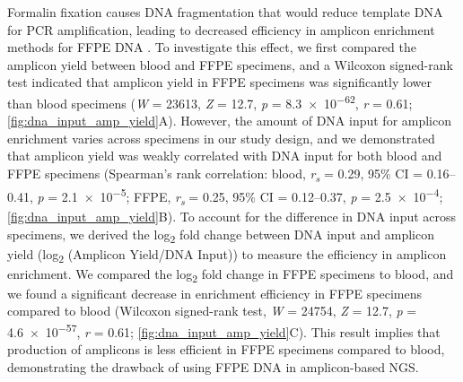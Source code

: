 Formalin fixation causes DNA fragmentation that would reduce template DNA for PCR amplification, leading to decreased efficiency in amplicon enrichment methods for FFPE DNA \cite{Didelot2013, Do2015a, Wong2013, Wong2014}. To investigate this effect, we first compared the amplicon yield between blood and FFPE specimens, and a Wilcoxon signed-rank test indicated that amplicon yield in FFPE specimens was significantly lower than blood specimens (\textit{W} = 23613, \textit{Z} = 12.7, \textit{p} = \num{8.3e-62}, \textit{r} = 0.61; \autoref{fig:dna_input_amp_yield}A). However, the amount of DNA input for amplicon enrichment varies across specimens in our study design, and we demonstrated that amplicon yield was weakly correlated with DNA input for both blood and FFPE specimens (Spearman's rank correlation: blood, \textit{r\textsubscript{s}} = 0.29, 95\% CI = 0.16--0.41, \textit{p} = \num{2.1e-5}; FFPE, \textit{r\textsubscript{s}} = 0.25, 95\% CI = 0.12--0.37, \textit{p} = \num{2.5e-4}; \autoref{fig:dna_input_amp_yield}B). To account for the difference in DNA input across specimens, we derived the log\textsubscript{2} fold change between DNA input and amplicon yield (log\textsubscript{2} (Amplicon Yield/DNA Input)) to measure the efficiency in amplicon enrichment. We compared the log\textsubscript{2} fold change in FFPE specimens to blood, and we found a significant decrease in enrichment efficiency in FFPE specimens compared to blood (Wilcoxon signed-rank test, \textit{W} = 24754, \textit{Z} = 12.7, \textit{p} = \num{4.6e-57}, \textit{r} = 0.61; \autoref{fig:dna_input_amp_yield}C). This result implies that production of amplicons is less efficient in FFPE specimens compared to blood, demonstrating the drawback of using FFPE DNA in amplicon-based NGS.

